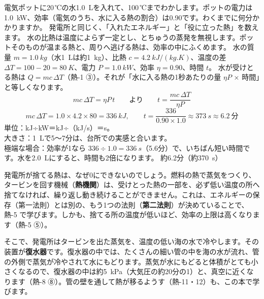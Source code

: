 \begin{phreidai}[電気ポットでお湯をわかす時間]\label{ph:熱-0:ex2}
電気ポットに20\,℃の水\qty{1.0}{L}を入れて、100\,℃までわかします。ポットの電力は\qty{1.0}{kW}、効率（電気のうち、水に入る熱の割合）は0.90です。わくまでに何分かかりますか。
\phbamen
発電所と同じく、「入れたエネルギー」と「役に立った熱」を数えます。
\phmushi
水の比熱は温度によらず一定とし、とちゅうの蒸発を無視します。ポットそのものが温まる熱と、周りへ逃げる熱は、効率の中にふくめます。
\phzu
水の質量 $m=\qty{1.0}{kg}$（水\qty{1}{L}は約\qty{1}{kg}）、比熱 $c=\qty{4.2}{kJ/(kg.K)}$、温度の差 $\Delta T=100-20=\qty{80}{K}$、電力 $P=\qty{1.0}{kW}$、効率 $\eta=0.90$、時間 $t$。
\phriyu
水が受けとる熱は $Q=mc\,\Delta T$（熱-1 ③）。それが「水に入る熱の1秒あたりの量 $\eta P$ × 時間」と等しくなります。
\phtateru
\[mc\,\Delta T=\eta P\,t\qquad\text{より}\qquad t=\frac{mc\,\Delta T}{\eta P}\]
\phtoku
\[mc\,\Delta T=1.0\times4.2\times80=\qty{336}{kJ},\qquad t=\frac{336}{0.90\times1.0}\approx\qty{373}{s}\approx6.2\ \text{分}\]
\phtashikame
単位：kJ÷kW＝kJ÷（kJ/s）＝s。\\
大きさ：\qty{1}{L}で5〜7分は、台所での実感と合います。\\
極端な場合：効率が1なら $336\div1.0=\qty{336}{s}$（5.6分）で、いちばん短い時間です。水を\qty{2.0}{L}にすると、時間も2倍になります。
\kotae 約6.2分（約\qty{370}{s}）
\end{phreidai}

\leavevmode\label{ph:熱-0:sec4}発電所が捨てる熱は、なぜ0にできないのでしょう。燃料の熱で蒸気をつくり、タービンを回す機械（\textbf{熱機関}）は、受けとった熱の一部を、必ず低い温度の所へ捨てなければ、繰り返し動き続けることができません。これは、エネルギーの保存（第一法則）とは別の、もう1つの法則（\textbf{第二法則}）が決めていることで、熱-5 で学びます。しかも、捨てる所の温度が低いほど、効率の上限は高くなります（熱-5 ⑤）。

そこで、発電所はタービンを出た蒸気を、温度の低い海の水で冷やします。その装置が\textbf{復水器}です。復水器の中では、たくさんの細い管の中を海の水が流れ、管の外側で蒸気が冷やされて水にもどります。蒸気が水にもどると体積がとても小さくなるので、復水器の中は約\qty{5}{kPa}（大気圧の約20分の1）と、真空に近くなります（熱-8 ⑧）。管の壁を通して熱が移るようす（熱-11・12）も、この本で学びます。

